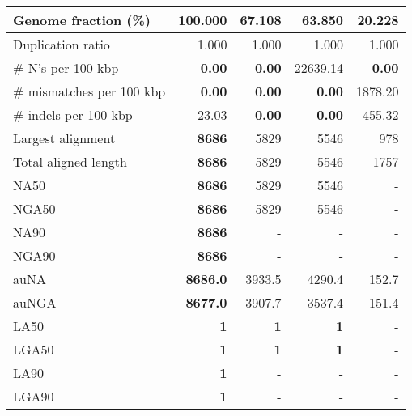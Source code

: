 \documentclass[12pt,a4paper]{article}
\begin{document}
\begin{table}[ht]
\begin{center}
\begin{tabular}{|l*{4}{|r}|}
Genome fraction (\%) & {\bf 100.000} & 67.108 & 63.850 & 20.228 \\ \hline
Duplication ratio & 1.000 & 1.000 & 1.000 & 1.000 \\ \hline
\# N's per 100 kbp & {\bf 0.00} & {\bf 0.00} & 22639.14 & {\bf 0.00} \\ \hline
\# mismatches per 100 kbp & {\bf 0.00} & {\bf 0.00} & {\bf 0.00} & 1878.20 \\ \hline
\# indels per 100 kbp & 23.03 & {\bf 0.00} & {\bf 0.00} & 455.32 \\ \hline
Largest alignment & {\bf 8686} & 5829 & 5546 & 978 \\ \hline
Total aligned length & {\bf 8686} & 5829 & 5546 & 1757 \\ \hline
NA50 & {\bf 8686} & 5829 & 5546 & - \\ \hline
NGA50 & {\bf 8686} & 5829 & 5546 & - \\ \hline
NA90 & {\bf 8686} & - & - & - \\ \hline
NGA90 & {\bf 8686} & - & - & - \\ \hline
auNA & {\bf 8686.0} & 3933.5 & 4290.4 & 152.7 \\ \hline
auNGA & {\bf 8677.0} & 3907.7 & 3537.4 & 151.4 \\ \hline
LA50 & {\bf 1} & {\bf 1} & {\bf 1} & - \\ \hline
LGA50 & {\bf 1} & {\bf 1} & {\bf 1} & - \\ \hline
LA90 & {\bf 1} & - & - & - \\ \hline
LGA90 & {\bf 1} & - & - & - \\ \hline
\end{tabular}
\end{center}
\end{table}
\end{document}
